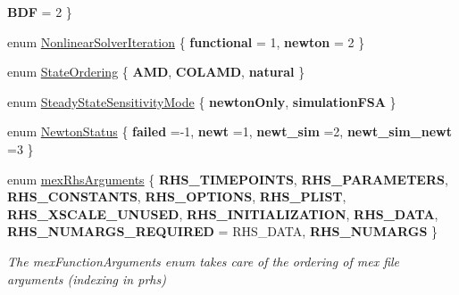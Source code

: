 \begin{DoxyCompactItemize}
{\bfseries B\+DF} = 2
 \}
\item 
enum \mbox{\hyperlink{namespaceamici_a13388d34e4c35bb592c3e821c35cc923}{Nonlinear\+Solver\+Iteration}} \{ {\bfseries functional} = 1, 
{\bfseries newton} = 2
 \}
\item 
enum \mbox{\hyperlink{namespaceamici_a890d968060d6d830aeed98dbeb04447f}{State\+Ordering}} \{ {\bfseries A\+MD}, 
{\bfseries C\+O\+L\+A\+MD}, 
{\bfseries natural}
 \}
\item 
enum \mbox{\hyperlink{namespaceamici_a1f7d44f04185d57423d01d47d13470a6}{Steady\+State\+Sensitivity\+Mode}} \{ {\bfseries newton\+Only}, 
{\bfseries simulation\+F\+SA}
 \}
\item 
enum \mbox{\hyperlink{namespaceamici_a3fb34b6904b8b45827b51132977431da}{Newton\+Status}} \{ {\bfseries failed} =-\/1, 
{\bfseries newt} =1, 
{\bfseries newt\+\_\+sim} =2, 
{\bfseries newt\+\_\+sim\+\_\+newt} =3
 \}
\item 
\mbox{\label{namespaceamici_a21e434b9deb0ebd129f5b554336b8268}} 
enum \mbox{\hyperlink{namespaceamici_a21e434b9deb0ebd129f5b554336b8268}{mex\+Rhs\+Arguments}} \{ \newline
{\bfseries R\+H\+S\+\_\+\+T\+I\+M\+E\+P\+O\+I\+N\+TS}, 
{\bfseries R\+H\+S\+\_\+\+P\+A\+R\+A\+M\+E\+T\+E\+RS}, 
{\bfseries R\+H\+S\+\_\+\+C\+O\+N\+S\+T\+A\+N\+TS}, 
{\bfseries R\+H\+S\+\_\+\+O\+P\+T\+I\+O\+NS}, 
\newline
{\bfseries R\+H\+S\+\_\+\+P\+L\+I\+ST}, 
{\bfseries R\+H\+S\+\_\+\+X\+S\+C\+A\+L\+E\+\_\+\+U\+N\+U\+S\+ED}, 
{\bfseries R\+H\+S\+\_\+\+I\+N\+I\+T\+I\+A\+L\+I\+Z\+A\+T\+I\+ON}, 
{\bfseries R\+H\+S\+\_\+\+D\+A\+TA}, 
\newline
{\bfseries R\+H\+S\+\_\+\+N\+U\+M\+A\+R\+G\+S\+\_\+\+R\+E\+Q\+U\+I\+R\+ED} = R\+H\+S\+\_\+\+D\+A\+TA, 
{\bfseries R\+H\+S\+\_\+\+N\+U\+M\+A\+R\+GS}
 \}
\begin{DoxyCompactList}\small\item\em The mex\+Function\+Arguments enum takes care of the ordering of mex file arguments (indexing in prhs) \end{DoxyCompactList}\end{DoxyCompactItemize}
